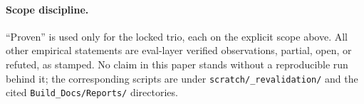 \documentclass[11pt,a4paper]{article}
\begin{document}
\paragraph{Scope discipline.} ``Proven'' is used only for the locked trio, each on the explicit scope above. All other empirical statements are eval-layer verified observations, partial, open, or refuted, as stamped. No claim in this paper stands without a reproducible run behind it; the corresponding scripts are under \texttt{scratch/\_revalidation/} and the cited \texttt{Build\_Docs/Reports/} directories.
\end{document}
